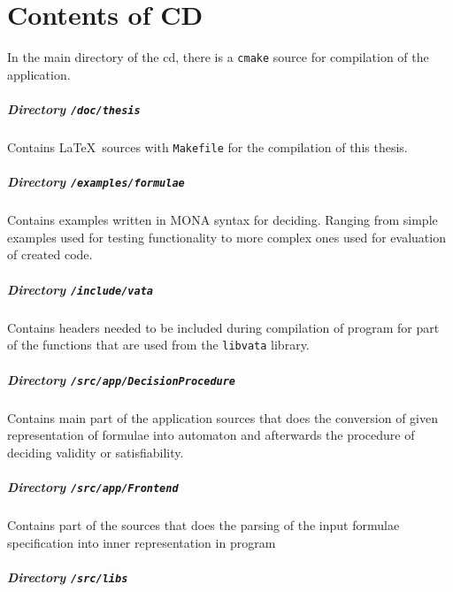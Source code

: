 \chapter{Contents of CD}

In the main directory of the cd, there is a \texttt{cmake} source for
compilation of the application.

\paragraph{Directory \texttt{/doc/thesis}}

Contains \LaTeX\ sources with \texttt{Makefile} for the compilation of
this thesis.

\paragraph{Directory \texttt{/examples/formulae}}

Contains examples written in \textsc{MONA} syntax for deciding. Ranging from
simple examples used for testing functionality to more complex ones used for
evaluation of created code.

\paragraph{Directory \texttt{/include/vata}}

Contains headers needed to be included during compilation of program for part of
the functions that are used from the \texttt{libvata} library.

\paragraph{Directory \texttt{/src/app/DecisionProcedure}}

Contains main part of the application sources that does the conversion of given
representation of formulae into automaton and afterwards the procedure of
deciding validity or satisfiability.

\paragraph{Directory \texttt{/src/app/Frontend}}

Contains part of the sources that does the parsing of the input formulae
specification into inner representation in program

\paragraph{Directory \texttt{/src/libs}}

